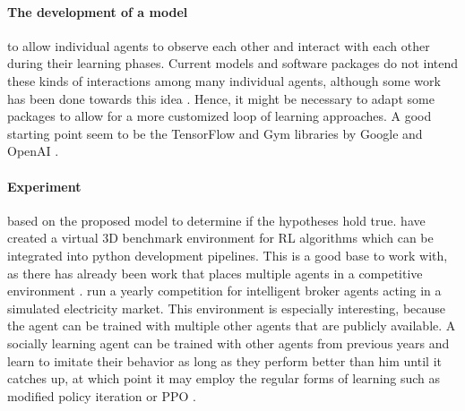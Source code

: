 \documentclass[12pt,a4paper]{article}
\begin{document}

\paragraph{The development of a model} to allow individual agents to observe each other and interact with each other
during their learning phases. Current models and software packages do not intend these kinds of interactions among many
individual agents, although some work has been done towards this idea \cite{duan2017one}. Hence, it might be necessary
to adapt some packages to allow for a more customized loop of learning approaches. A good starting point seem to be the
TensorFlow and Gym libraries by Google and OpenAI \cite{tensorflow2015-whitepaper,openaigym}.

\paragraph{Experiment} based on the proposed model to determine if the hypotheses hold true.
\citeauthor{openaigym} have created a virtual 3D benchmark environment for \ac{RL} algorithms which can be integrated
into python development pipelines. This is a good base to work with, as there has already been work that places multiple
agents in a competitive environment \cite{bansal2017emergent}.
\citeauthor{ketter2016powertac} run a yearly competition for intelligent broker agents acting in a simulated electricity
market. This environment is especially interesting, because the agent can be trained with multiple other agents that are
publicly available. A socially learning agent can be trained with other agents from previous years and learn to imitate
their behavior as long as they perform better than him until it catches up, at which point it may employ the regular
forms of learning such as modified policy iteration \cite[p.657]{russell2016artificial} or \ac{PPO}
\cite{proximalpolicyopt}.


\end{document}
